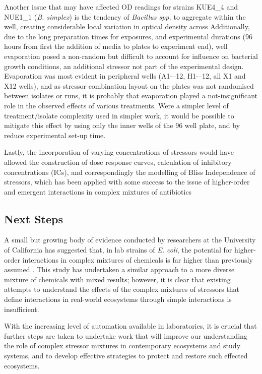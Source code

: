 \documentclass[final,1p,times]{elsarticle}
\begin{document}
Another issue that may have affected OD readings for strains KUE4\_4 and NUE1\_1 (\textit{B. simplex}) is the tendency of \textit{Bacillus spp.} to aggregate within the well, creating considerable local variation in optical density across 
Additionally, due to the long preparation times for exposures, and experimental durations (96 hours from first the addition of media to plates to experiment end), well evaporation posed a non-random but difficult to account for influence on bacterial growth conditions, an additional stressor not part of the experimental design. Evaporation was most evident in peripheral wells (A1-–12, H1-–12, all X1 and X12 wells), and as stressor combination layout on the plates was not randomised between isolates or runs, it is probably that evaporation played a not-insignificant role in the observed effects of various treatments. Were a simpler level of treatment/isolate complexity used in simpler work, it would be possible to mitigate this effect by using only the inner wells of the 96 well plate, and by reduce experimental set-up time. 

Lastly, the incorporation of varying concentrations of stressors would have allowed the construction of dose response curves, calculation of inhibitory concentrations (ICs), and correspondingly the modelling of Bliss Independence \cite{Bliss1939} of stressors, which has been applied with some success to the issue of higher-order and emergent interactions in complex mixtures of antibiotics \cite{Beppler2016,Tekin2017PrevalenceInteractions} 
\subsection{Next Steps}
\label{S:4:4}

A small but growing body of evidence conducted by researchers at the University of California has suggested that, in lab strains of \textit{E. coli}, the potential for higher-order interactions in complex mixtures of chemicals is far higher than previously assumed \cite{Beppler2016,Tekin2016,Tekin2017PrevalenceInteractions}.  This study has undertaken a similar approach to a more diverse mixture of chemicals with mixed results; however, it is clear that existing attempts to understand the effects of the complex mixtures of stressors that define interactions in real-world ecosystems through simple interactions is insufficient.

With the increasing level of automation available in laboratories, it is crucial that further steps are taken to undertake work that will improve our understanding the role of complex stressor mixtures in contemporary ecosystems and study systems, and to develop effective strategies to protect and restore such effected ecosystems.
\end{document}
